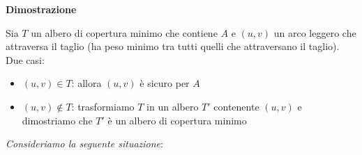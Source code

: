 \documentclass[../cheatSheetAlgoritmi.tex]{subfiles}
\begin{document}
\bigskip

\textbf{Dimostrazione}

Sia $T$ un albero di copertura minimo che contiene $A$ e $(u, v)$ un arco leggero che attraversa il taglio (ha peso minimo tra tutti quelli che attraversano il taglio). Due casi:
\begin{itemize}
	\item $(u, v) \in T$: allora $(u, v)$ è sicuro per $A$
	\item $(u, v) \notin T$: trasformiamo $T$ in un albero $T'$ contenente $(u, v)$ e dimostriamo che $T'$ è un albero di copertura minimo
\end{itemize}
 
\begin{flushleft}
\emph{Consideriamo la seguente situazione}:
\end{flushleft}
\end{document}
